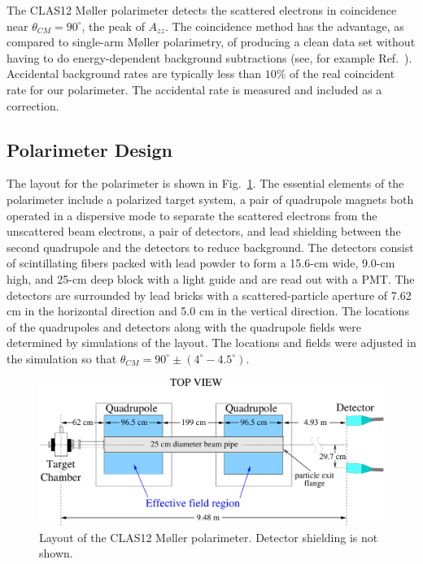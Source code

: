 The CLAS12 M{\o}ller polarimeter detects the scattered electrons in coincidence near $\theta_{CM}=90^\circ$, the peak of $A_{zz}$.  
The coincidence method has the advantage, as compared to 
single-arm M{\o}ller polarimetry, of producing a clean data set without having to do 
energy-dependent background subtractions (see, for example Ref.~\cite{arrington92}). Accidental background rates are typically less than
$10\%$ of the real coincident rate for our polarimeter. The accidental rate is measured and included as a correction.

\subsection{Polarimeter Design}
\label{sec-PolDesign}

The layout for the polarimeter is shown in Fig.~\ref{fig-PolLayout}. The essential elements of the polarimeter include a polarized target 
system, a pair of quadrupole magnets both operated in a dispersive mode to separate the scattered electrons from the unscattered  
beam electrons, a pair of detectors, and lead shielding between the second quadrupole and the detectors to reduce 
background.  The detectors consist of scintillating fibers packed with lead powder to form a 15.6-cm wide, 9.0-cm high, and 25-cm deep 
block with a light guide and are read out with a PMT. The detectors are surrounded by 
lead bricks with a scattered-particle aperture of 7.62 cm in the horizontal direction and 5.0 cm in the vertical direction.
The locations of the quadrupoles and detectors along with the quadrupole fields were determined by simulations of the layout. The 
locations and fields were adjusted in the simulation so that $\theta_{CM}=90^\circ\pm (4^\circ-4.5^\circ)$.

\begin{figure}[hbtp]
 \begin{center}
  \includegraphics[width=\textwidth]{MPLayout.pdf}
 \end{center}
 \caption[]{Layout of the CLAS12 M{\o}ller polarimeter. Detector shielding is not shown.}
 \label{fig-PolLayout}
\end{figure}


